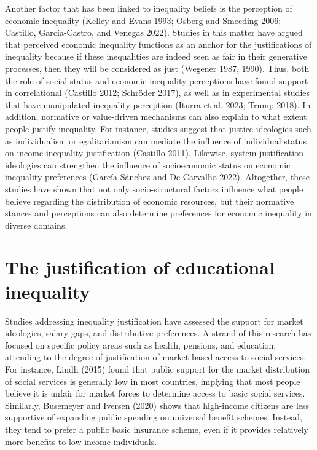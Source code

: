 \documentclass[
]{article}
\begin{document}
Another factor that has been linked to inequality beliefs is the
perception of economic inequality (Kelley and Evans 1993; Osberg and
Smeeding 2006; Castillo, García-Castro, and Venegas 2022). Studies in
this matter have argued that perceived economic inequality functions as
an anchor for the justifications of inequality because if these
inequalities are indeed seen as fair in their generative processes, then
they will be considered as just (Wegener 1987, 1990). Thus, both the
role of social status and economic inequality perceptions have found
support in correlational (Castillo 2012; Schröder 2017), as well as in
experimental studies that have manipulated inequality perception (Iturra
et al. 2023; Trump 2018). In addition, normative or value-driven
mechanisms can also explain to what extent people justify inequality.
For instance, studies suggest that justice ideologies such as
individualism or egalitarianism can mediate the influence of individual
status on income inequality justification (Castillo 2011). Likewise,
system justification ideologies can strengthen the influence of
socioeconomic status on economic inequality preferences (García-Sánchez
and De Carvalho 2022). Altogether, these studies have shown that not
only socio-structural factors influence what people believe regarding
the distribution of economic resources, but their normative stances and
perceptions can also determine preferences for economic inequality in
diverse domains.

\section{The justification of educational
inequality}\label{the-justification-of-educational-inequality}

Studies addressing inequality justification have assessed the support
for market ideologies, salary gaps, and distributive preferences. A
strand of this research has focused on specific policy areas such as
health, pensions, and education, attending to the degree of
justification of market-based access to social services. For instance,
Lindh (2015) found that public support for the market distribution of
social services is generally low in most countries, implying that most
people believe it is unfair for market forces to determine access to
basic social services. Similarly, Busemeyer and Iversen (2020) shows
that high-income citizens are less supportive of expanding public
spending on universal benefit schemes. Instead, they tend to prefer a
public basic insurance scheme, even if it provides relatively more
benefits to low-income individuals.
\end{document}
